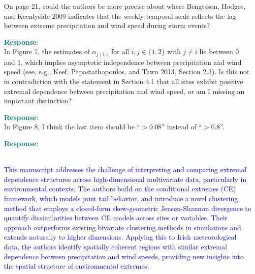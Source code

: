 \documentclass[a4paper,12pt]{article}
\begin{document}
{\color{teal}
\noindent
 On page 21, could the authors be more precise about where Bengtsson, Hodges, and Keenlyside
2009 indicates that the weekly temporal scale reflects the lag between extreme precipitation
and wind speed during storm events?
}

\noindent \textcolor{teal}{\bf Response}: \\


{\color{teal}
\noindent
In Figure 7, the estimates of $\alpha_{j \mid i, s}$ for all $i, j \in \{1, 2\}$ with $j \ne i$ lie between 0 and 1, which implies asymptotic independence between precipitation and wind speed (see, e.g., Keef, Papastathopoulos, and Tawn 2013, Section 2.3). 
Is this not in contradiction with the statement in Section 4.1 that all sites exhibit positive extremal dependence between precipitation and wind speed, or am I missing an important distinction?
}

\noindent \textcolor{teal}{\bf Response}: \\


{\color{teal}
\noindent
 In Figure 8, I think the last item should be ``$> 0.08$'' instead of ``$> 0.8$''.
}

\noindent \textcolor{teal}{\bf Response}: \\

\clearpage
\newpage


\\

\noindent \textcolor{blue}{
This manuscript addresses the challenge of interpreting and comparing extremal dependence structures across high-dimensional multivariate data, particularly in environmental contexts.
The authors build on the conditional extremes (CE) framework, which models joint tail behavior, and introduce a novel clustering method that employs a closed-form skew-geometric Jensen-Shannon divergence to quantify dissimilarities between CE models across sites or variables.
Their approach outperforms existing bivariate clustering methods in simulations and extends naturally to higher dimensions. 
Applying this to Irish meteorological data, the authors identify spatially coherent regions with similar extremal dependence between precipitation and wind speeds, providing new insights into the spatial structure of environmental extremes.
}
\end{document}
